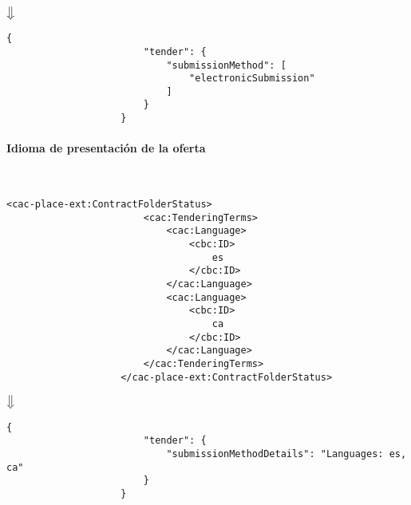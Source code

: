                 \begin{center}
                    $\big\Downarrow$
                \end{center}
                
                \begin{lstlisting}[language=lJSON]
                    {
                        "tender": {
                            "submissionMethod": [
                                "electronicSubmission"
                            ]
                        }
                    }
                \end{lstlisting}
                
            \paragraph{Idioma de presentación de la oferta} \mbox{}\\
                \begin{lstlisting}[language=lXML]
                    <cac-place-ext:ContractFolderStatus>
                        <cac:TenderingTerms>
                            <cac:Language>
                                <cbc:ID>
                                    es
                                </cbc:ID>
                            </cac:Language>
                            <cac:Language>
                                <cbc:ID>
                                    ca
                                </cbc:ID>
                            </cac:Language>
                        </cac:TenderingTerms>
                    </cac-place-ext:ContractFolderStatus>
                \end{lstlisting}
                
                \begin{center}
                    $\big\Downarrow$
                \end{center}
                
                \begin{lstlisting}[language=lJSON]
                    {
                        "tender": {
                            "submissionMethodDetails": "Languages: es, ca"
                        }
                    }
                \end{lstlisting}
                
